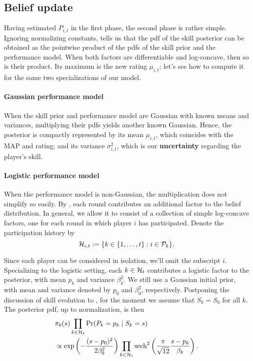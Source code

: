 \subsection{Belief update}
\label{sec:belief}

Having estimated $P_{i,t}$ in the first phase, the second phase is rather simple. Ignoring normalizing constants,  tells us that the pdf of the skill posterior can be obtained as the pointwise product of the pdfs of the skill prior and the performance model. When both factors are differentiable and log-concave, then so is their product. Its maximum is the new rating $\mu_{i,t}$; let's see how to compute it for the same two specializations of our model.

\paragraph{Gaussian performance model}
When the skill prior and performance model are Gaussian with known means and variances, multiplying their pdfs yields another known Gaussian. Hence, the posterior is compactly represented by its mean $\mu_{i,t}$, which coincides with the MAP and rating; and its variance $\sigma_{i,t}^2$, which is our \textbf{uncertainty} regarding the player's skill.

\paragraph{Logistic performance model}
When the performance model is non-Gaussian, the multiplication does not simplify so easily. By , each round contributes an additional factor to the belief distribution. In general, we allow it to consist of a collection of simple log-concave factors, one for each round in which player $i$ has participated. Denote the participation history by
\[{\mathcal{H}}_{i,t} := \{k\in\{1,\ldots,t\}:i\in\mathcal P_k\}.\]

Since each player can be considered in isolation, we'll omit the subscript $i$. Specializing to the logistic setting, each $k\in{\mathcal{H}}_t$ contributes a logistic factor to the posterior, with mean $p_k$ and variance $\beta_k^2$. We still use a Gaussian initial prior, with mean and variance denoted by $p_0$ and $\beta_0^2$, respectively. Postponing the discussion of skill evolution to , for the moment we assume that $S_k=S_0$ for all $k$. The posterior pdf, up to normalization, is then
\begin{align}
&\pi_0(s) \prod_{k\in{\mathcal{H}}_t} \Pr(P_k=p_k \mid S_k=s) \nonumber
\\&\propto \exp\left( -\frac{(s-p_0)^2}{2\beta_0^2} \right) \label{eq:posterior}
\prod_{k\in{\mathcal{H}}_t} \operatorname{sech}^{2}\left( \frac\pi{\sqrt{12}} \frac{s-p_k} {\beta_k} \right).
\end{align}

